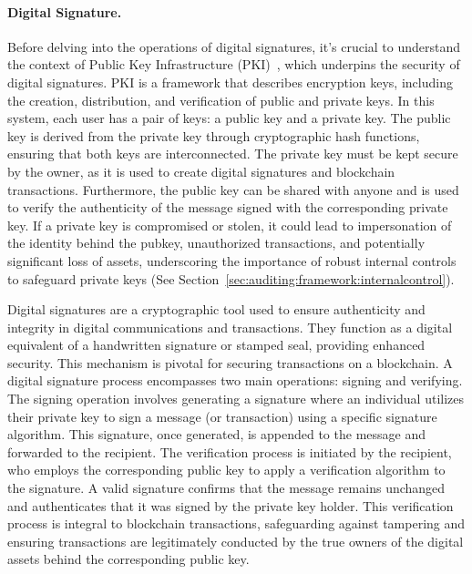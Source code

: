 
\paragraph{Digital Signature.}\label{digital_signature}
Before delving into the operations of digital signatures, it's crucial to understand the context of Public Key Infrastructure (PKI)~\cite{adams1999understanding}, which underpins the security of digital signatures. PKI is a framework that describes encryption keys, including the creation, distribution, and verification of public and private keys. In this system, each user has a pair of keys: a public key and a private key. The public key is derived from the private key through cryptographic hash functions, ensuring that both keys are interconnected. The private key must be kept secure by the owner, as it is used to create digital signatures and blockchain transactions. Furthermore, the public key can be shared with anyone and is used to verify the authenticity of the message signed with the corresponding private key. If a private key is compromised or stolen, it could lead to impersonation of the identity behind the pubkey, unauthorized transactions, and potentially significant loss of assets, underscoring the importance of robust internal controls to safeguard private keys (See Section~\ref{sec:auditing:framework:internalcontrol}).

Digital signatures are a cryptographic tool used to ensure authenticity and integrity in digital communications and transactions. They function as a digital equivalent of a handwritten signature or stamped seal, providing enhanced security. This mechanism is pivotal for securing transactions on a blockchain. A digital signature process encompasses two main operations: signing and verifying. The signing operation involves generating a signature where an individual utilizes their private key to sign a message (or transaction) using a specific signature algorithm. This signature, once generated, is appended to the message and forwarded to the recipient. The verification process is initiated by the recipient, who employs the corresponding public key to apply a verification algorithm to the signature. A valid signature confirms that the message remains unchanged and authenticates that it was signed by the private key holder. This verification process is integral to blockchain transactions, safeguarding against tampering and ensuring transactions are legitimately conducted by the true owners of the digital assets behind the corresponding public key. 

